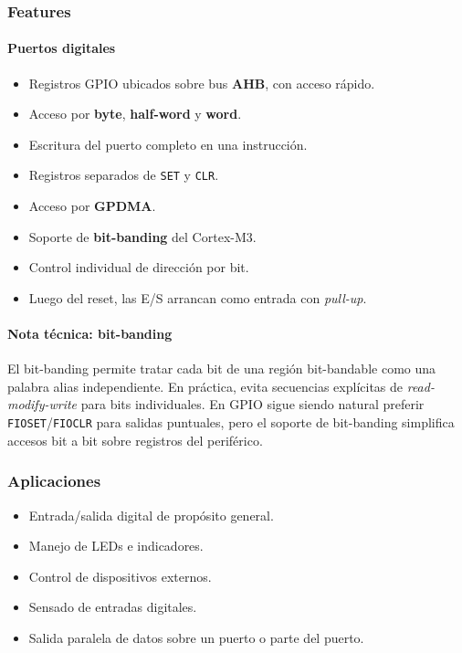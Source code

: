 \subsubsection{Features}
\paragraph{Puertos digitales}
\begin{itemize}
  \item Registros GPIO ubicados sobre bus \textbf{AHB}, con acceso rápido.
  \item Acceso por \textbf{byte}, \textbf{half-word} y \textbf{word}.
  \item Escritura del puerto completo en una instrucción.
  \item Registros separados de \texttt{SET} y \texttt{CLR}.
  \item Acceso por \textbf{GPDMA}.
  \item Soporte de \textbf{bit-banding} del Cortex-M3.
  \item Control individual de dirección por bit.
  \item Luego del reset, las E/S arrancan como entrada con \textit{pull-up}.
\end{itemize}

\paragraph{Nota técnica: bit-banding}
El bit-banding permite tratar cada bit de una región bit-bandable como una palabra alias independiente. En práctica, evita secuencias explícitas de \textit{read-modify-write} para bits individuales. En GPIO sigue siendo natural preferir \texttt{FIOSET}/\texttt{FIOCLR} para salidas puntuales, pero el soporte de bit-banding simplifica accesos bit a bit sobre registros del periférico.

\subsubsection{Aplicaciones}
\begin{itemize}
  \item Entrada/salida digital de propósito general.
  \item Manejo de LEDs e indicadores.
  \item Control de dispositivos externos.
  \item Sensado de entradas digitales.
  \item Salida paralela de datos sobre un puerto o parte del puerto.
\end{itemize}

